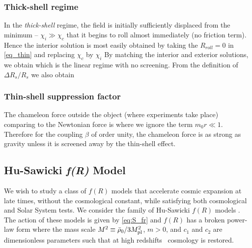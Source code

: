 \subsubsection{Thick-shell regime}
In the \textit{thick-shell} regime, the field is initially sufficiently displaced from the minimum -- $\chi_i\gg\chi_c$ that it begins to roll almost immediately (no friction term). Hence the interior solution is most easily obtained by taking the $R_{roll}=0$ in \eqref{eq_thin} and replacing $\chi_c$ by $\chi_i$
By matching the interior and exterior solutions, we obtain
which is the linear regime with no screening. From the definition of $\Delta R_s/R_s$ we also obtain
\subsubsection{Thin-shell suppression factor}
The chameleon force outside the object (where experiments take place) comparing to the Newtonian force is
where we ignore the term $m_0 r\ll1$. Therefore for the coupling $\beta$ of order unity, the chameleon force is as strong as gravity unless it is screened away by the thin-shell effect.
\subsection{Hu-Sawicki \texorpdfstring{\textit{\lowercase{f}(R)}}{fR} Model}
We wish to study a class of $f(R)$ models that accelerate cosmic expansion at late times, without the cosmological constant, while satisfying both cosmological and Solar System tests. We consider the family of Hu-Sawicki $f(R)$ models \parencite{Hu-Saw}. The action of these models is given by \eqref{eq:S_fr} and $f(R)$ has a broken power-law form
where the mass scale $M^2\equiv\bar\rho_0/3M_{\text{\scriptsize pl}}^2$, $m>0$, and $c_1$ and $c_2$ are dimensionless parameters such that at high redshifts \LCDM\ cosmology is restored.

